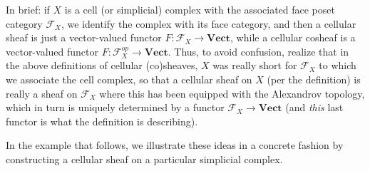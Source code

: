 \documentclass[a4paper]{book}
\theoremstyle{definition}
\theoremstyle{definition}
\theoremstyle{definition}
\theoremstyle{theorem}
\theoremstyle{definition}
\begin{document}
	In brief: if $X$ is a cell (or simplicial) complex with the associated face poset category $\mathcal{F}_X$, we identify the complex with its face category, and then a cellular sheaf is just a vector-valued functor $F: \mathcal{F}_X \rightarrow \textbf{Vect}$, while a cellular cosheaf is a vector-valued functor $F: \mathcal{F}_X^{op} \rightarrow \textbf{Vect}$. Thus, to avoid confusion, realize that in the above definitions of cellular (co)sheaves, $X$ was really short for $\mathcal{F}_X$ to which we associate the cell complex, so that a cellular sheaf on $X$ (per the definition) is really a sheaf on $\mathcal{F}_X$ where this has been equipped with the Alexandrov topology, which in turn is uniquely determined by a functor $\mathcal{F}_X \rightarrow \textbf{Vect}$ (and \textit{this} last functor is what the definition is describing). \par  
 	In the example that follows, we illustrate these ideas in a concrete fashion by constructing a cellular sheaf on a particular simplicial complex. 
\end{document}
